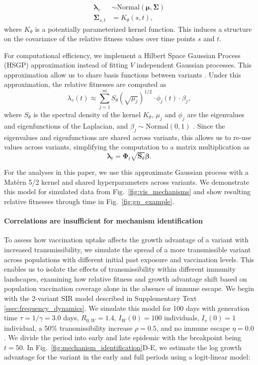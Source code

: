 \documentclass[11pt,oneside,letterpaper]{article}
\renewcommand{\vec}[1]{\boldsymbol{#1}}
\newcommand{\wt}{W}
\newcommand{\varEscape}{\eta}
\newcommand{\varTransmission}{\rho}
\begin{document}
\begin{align*}
    \vec{\lambda}_{v} &\sim \text{Normal}(\vec{\mu}, \vec{\Sigma})\\
    \vec{\Sigma}_{s, t} &= K_{\theta}(s, t),
\end{align*}
where $K_{\theta}$ is a potentially parameterized kernel function.
This induces a structure on the covariance of the relative fitness values over time points $s$ and $t$.

For computational efficiency, we implement a Hilbert Space Gaussian Process (HSGP) approximation instead of fitting $V$ independent Gaussian processes.
This approximation allow us to share basis functions between variants \cite{riutortmayol2022practical}.
Under this approximation, the relative fitnesses are computed as
\begin{equation}
    \lambda_{v}(t) \approx \sum_{j=1}^{m} S_{\theta}(\sqrt{\mu_{j}})^{1/2} \cdot \phi_{j}(t) \cdot \beta_{j},
\end{equation}
where $S_{\theta}$ is the spectral density of the kernel $K_\theta$, $\mu_{j}$ and $\phi_{j}$ are the eigenvalues and eigenfunctions of the Laplacian, and $\beta_{j} \sim \text{Normal}(0,1)$ \cite{riutortmayol2022practical}.
Since the eigenvalues and eigenfunctions are shared across variants, this allows us to re-use values across variants, simplifying the computation to a matrix multiplication as
\begin{equation*}
    \vec{\lambda}_{t} = \vec{\Phi}_{t} \sqrt{\vec{S}_{\theta}}\vec{\beta}.
\end{equation*}

For the analyses in this paper, we use this approximate Gaussian process with a Mat\'ern 5/2 kernel and shared hyperparameters across variants.
We demonstrate this model for simulated data from Fig.~\ref{fig:vis_mechanisms} and show resulting relative fitnesses through time in Fig.~\ref{fig:gp_example}.

\paragraph{Correlations are insufficient for mechanism identification}

To assess how vaccination uptake affects the growth advantage of a variant with increased transmissibility, we simulate the spread of a more transmissible variant across populations with different initial past exposure and vaccination levels.
This enables us to isolate the effects of transmissibility within different immunity landscapes, examining how relative fitness and growth advantage shift based on population vaccination coverage alone in the absence of immune escape.
We begin with the 2-variant SIR model described in Supplementary Text \ref{ssec:frequency_dynamics}.
We simulate this model for 100 days with generation time $\tau = 1 / \gamma = 3.0$ days, $R_{0, \wt} = 1.4$, $I_{\wt}(0) = 100$ individuals, $I_v(0) = 1$ individual, a 50\% transmissibility increase $\varTransmission=0.5$, and no immune escape $\varEscape=0.0$.
We divide the period into early and late epidemic with the breakpoint being $t=50$.
In Fig.~\ref{fig:mechanism_identification}D-E, we estimate the log growth advantage for the variant in the early and full periods using a logit-linear model:
\end{document}
